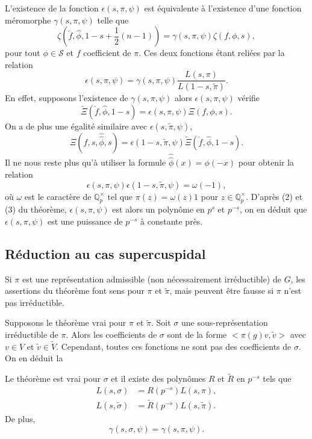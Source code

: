 L'existence de la fonction $\epsilon(s, \pi, \psi)$ est équivalente à l'existence d'une fonction méromorphe $\gamma(s,\pi,\psi)$ telle que
\begin{equation}
\zeta(\check{f}, \hat{\phi}, 1-s+\frac{1}{2}(n-1))=\gamma(s, \pi, \psi)\zeta(f, \phi, s),
\end{equation}
pour tout $\phi \in \mathcal{S}$ et $f$ coefficient de $\pi$. Ces deux fonctions étant reliées par la relation
\begin{equation}
\label{gammaepsilon}
\epsilon(s,\pi,\psi)=\gamma(s,\pi,\psi)\frac{L(s,\pi)}{L(1-s,\tilde{\pi})}.
\end{equation}
En effet, supposons l'existence de $\gamma(s,\pi,\psi)$ alors $\epsilon(s,\pi,\psi)$ vérifie 
\begin{equation}
\tilde{\Xi}(\check{f}, \hat{\phi}, 1-s) = \epsilon(s, \pi, \psi)\Xi(f, \phi, s).
\end{equation}
On a de plus une égalité similaire avec $\epsilon(s,\tilde{\pi},\psi)$,
\begin{equation}
\Xi(f, s, \hat{\hat{\phi}}, s)=\epsilon(1-s, \tilde{\pi}, \psi)\tilde{\Xi}(\check{f}, \hat{\phi}, 1-s).
\end{equation}
Il ne nous reste plus qu'à utiliser la formule $\hat{\hat{\phi}}(x)=\phi(-x)$ pour obtenir la relation
\begin{equation}
\epsilon(s, \pi, \psi)\epsilon(1-s, \tilde{\pi}, \psi)=\omega(-1),
\end{equation}
où $\omega$ est le caractère de $\mathbb{Q}_p^\times$ tel que $\pi(z)=\omega(z)1$ pour $z\in \mathbb{Q}_p^\times$. D'après (2) et (3) du théorème, $\epsilon(s, \pi, \psi)$ est alors un polynôme en $p^s$ et $p^{-s}$, on en déduit que $\epsilon(s, \pi, \psi)$ est une puissance de $p^{-s}$ à constante près.

\subsection{Réduction au cas supercuspidal}

Si $\pi$ est une représentation admissible (non nécessairement irréductible) de $G$, les assertions du théorème font sens pour $\pi$ et $\tilde{\pi}$, mais peuvent être fausse si $\pi$ n'est pas irréductible.

Supposons le théorème vrai pour $\pi$ et $\tilde{\pi}$. Soit $\sigma$ une sous-représentation irréductible de $\pi$. Alors les coefficients de $\sigma$ sont de la forme $<\pi(g)v,\tilde{v}>$ avec $v\in V$ et $\tilde{v} \in \tilde{V}$. Cependant, toutes ces fonctions ne sont pas des coefficients de $\sigma$. On en déduit la
\begin{proposition}
\label{comp_ind1}
Le théorème est vrai pour $\sigma$ et il existe des polynômes $R$ et $\tilde{R}$ en $p^{-s}$ tels que
\begin{align}
L(s,\sigma)&=R(p^{-s})L(s,\pi), \\
L(s,\tilde{\sigma})&=\tilde{R}(p^{-s})L(s,\tilde{\pi}).
\end{align}
De plus,
\begin{equation}
\gamma(s,\sigma,\psi)=\gamma(s,\pi,\psi).
\end{equation}
\end{proposition}


